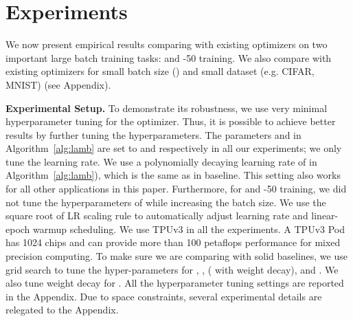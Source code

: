 \documentclass{article} \usepackage{iclr2020_conference,times}
\begin{document}
\section{Experiments}
\label{sec:experiments}
We now present empirical results comparing  with existing optimizers on two important large batch training tasks:  and -50 training. 
We also compare  with existing optimizers for small batch size () and small dataset (e.g. CIFAR, MNIST) (see Appendix).

{\bf Experimental Setup. } To demonstrate its robustness, we use very minimal hyperparameter tuning for the  optimizer. Thus, it is possible to achieve better results by further tuning the hyperparameters. The parameters  and  in Algorithm~\ref{alg:lamb} are set to  and  respectively in all our experiments; we only tune the learning rate. We use a polynomially decaying learning rate of  in Algorithm~\ref{alg:lamb}), which is the same as in  baseline. This setting also works for all other applications in this paper.
Furthermore, for  and -50  training, we did not tune the hyperparameters of  while increasing the batch size. We use the square root of LR scaling rule to automatically adjust learning rate and linear-epoch warmup scheduling. We use TPUv3 in all the experiments.
A TPUv3 Pod has 1024 chips and can provide more than 100 petaflops performance for mixed precision computing.
To make sure we are comparing with solid baselines, we use grid search to tune the hyper-parameters for 
, ,  ( with weight decay), and . We also tune weight decay for . All the hyperparameter tuning settings are reported in the Appendix. Due to space constraints, several experimental details are relegated to the Appendix.
\end{document}
